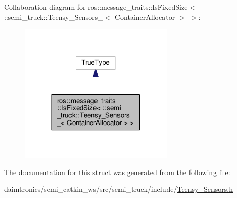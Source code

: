 Collaboration diagram for ros\+:\+:message\+\_\+traits\+:\+:Is\+Fixed\+Size$<$ \+:\+:semi\+\_\+truck\+:\+:Teensy\+\_\+\+Sensors\+\_\+$<$ Container\+Allocator $>$ $>$\+:\nopagebreak
\begin{figure}[H]
\begin{center}
\leavevmode
\includegraphics[width=209pt]{structros_1_1message__traits_1_1_is_fixed_size_3_01_1_1semi__truck_1_1_teensy___sensors___3_01_c291bb9ff93cc810544d8e334bf4d8ed7}
\end{center}
\end{figure}


The documentation for this struct was generated from the following file\+:\begin{DoxyCompactItemize}
\item 
daimtronics/semi\+\_\+catkin\+\_\+ws/src/semi\+\_\+truck/include/\hyperlink{_teensy___sensors_8h}{Teensy\+\_\+\+Sensors.\+h}\end{DoxyCompactItemize}
